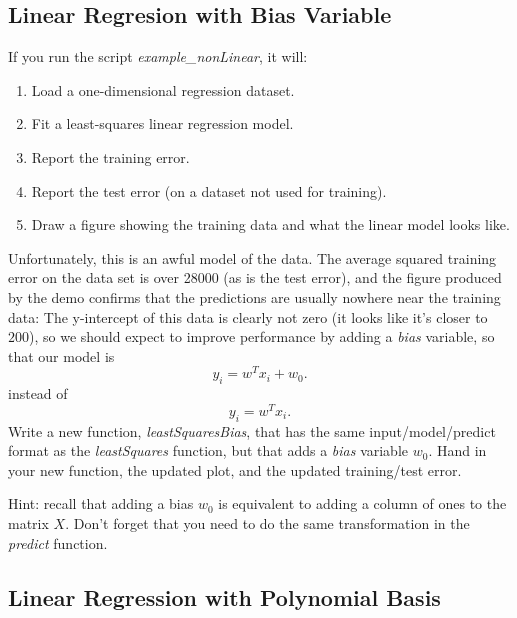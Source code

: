\documentclass{article}
\def\blu#1{{\color{blu}#1}}
\newcommand{\centerfig}[2]{\begin{center}\texttt{[image: a2f/\#2]}\end{center}}
\def\enum#1{\begin{enumerate}#1\end{enumerate}}
\begin{document}

\subsection{Linear Regresion with Bias Variable}

If you run the script \emph{example\_nonLinear}, it will:
\enum{
\item Load a one-dimensional regression dataset.
\item Fit a least-squares linear regression model.
\item Report the training error.
\item Report the test error (on a dataset not used for training).
\item Draw a figure showing the training data and what the linear model looks like.
}
Unfortunately, this is an awful model of the data. The average squared training error on the data set is over 28000 (as is the test error), and the figure produced by the demo confirms that the predictions are usually nowhere near the training data:
The y-intercept of this data is clearly not zero (it looks like it's closer to $200$), so we should expect to improve performance by adding a \emph{bias} variable, so that our model is
\[
y_i = w^Tx_i + w_0.
\]
instead of
\[
y_i = w^Tx_i.
\]
\blu{Write a new function, \emph{leastSquaresBias}, that has the same input/model/predict format as the \emph{leastSquares} function, but that adds a \emph{bias} variable $w_0$. Hand in your new function, the updated plot, and the updated training/test error.}

Hint: recall that adding a bias $w_0$ is equivalent to adding a column of ones to the matrix $X$. Don't forget that you need to do the same transformation in the \emph{predict} function.


\subsection{Linear Regression with Polynomial Basis}
\end{document}
